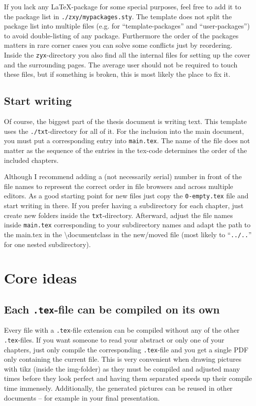 \documentclass[../main.tex]{subfiles}
\begin{document}
If you lack any LaTeX-package for some special purposes, feel free to add it to the package list in \texttt{./zxy/mypackages.sty}.
The template does not split the package list into multiple files (e.g. for \enquote{template-packages} and \enquote{user-packages}) to avoid double-listing of any package.
Furthermore the order of the packages matters in rare corner cases you can solve some conflicts just by reordering.
Inside the \texttt{zyx}-directory you also find all the internal files for setting up the cover and the surrounding pages.
The average user should not be required to touch these files, but if something is broken, this is most likely the place to fix it.

\newpage
\subsection{Start writing}

Of course, the biggest part of the thesis document is writing text.
This template uses the \texttt{./txt}-directory for all of it.
For the inclusion into the main document, you must put a corresponding entry into \texttt{main.tex}.
The name of the file does not matter as the sequence of the entries in the tex-code determines the order of the included chapters.

Although I recommend adding a (not necessarily serial) number in front of the file names to represent the correct order in file browsers and across multiple editors.
As a good starting point for new files just copy the \texttt{0-empty.tex} file and start writing in there.
If you prefer having a subdirectory for each chapter, just create new folders inside the \texttt{txt}-directory.
Afterward, adjust the file names inside \texttt{main.tex} corresponding to your subdirectory names and adapt the path to the main.tex in the \textbackslash documentclass in the new/moved file (most likely to \enquote{\texttt{../..}} for one nested subdirectory).


\section{Core ideas}

\subsection{Each \texttt{.tex}-file can be compiled on its own}
Every file with a \texttt{.tex}-file extension can be compiled without any of the other \texttt{.tex}-files.
If you want someone to read your abstract or only one of your chapters, just only compile the corresponding \texttt{.tex}-file and you get a single PDF only containing the current file.
This is very convenient when drawing pictures with tikz (inside the img-folder) as they must be compiled and adjusted many times before they look perfect and having them separated speeds up their compile time immensely.
Additionally, the generated pictures can be reused in other documents -- for example in your final presentation.
\end{document}
